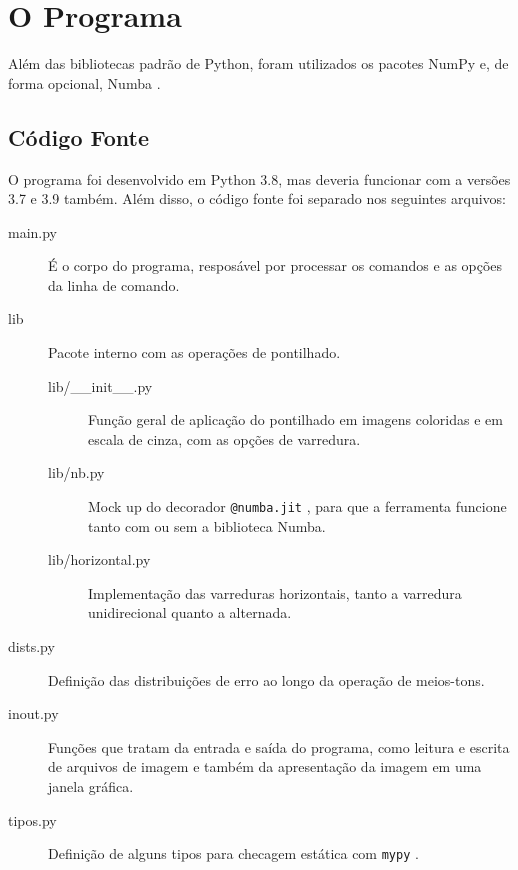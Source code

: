 \section{O Programa}

Além das bibliotecas padrão de Python, foram utilizados os pacotes NumPy \autocite{ref:numpy} e, de forma opcional, Numba \autocite{ref:numba}.

\subsection{Código Fonte}

    O programa foi desenvolvido em Python 3.8, mas deveria funcionar com a versões 3.7 e 3.9 também. Além disso, o código fonte foi separado nos seguintes arquivos:

    \begin{description}
        \item[main.py] É o corpo do programa, resposável por processar os comandos e as opções da linha de comando.

        \item[lib] Pacote interno com as operações de pontilhado.

        \begin{description}
            \item[lib/\_\_init\_\_.py] Função geral de aplicação do pontilhado em imagens coloridas e em escala de cinza, com as opções de varredura.

            \item[lib/nb.py] Mock up do decorador \texttt{@numba.jit} \autocite{ref:numbajit}, para que a ferramenta funcione tanto com ou sem a biblioteca Numba.

            \item[lib/horizontal.py] Implementação das varreduras horizontais, tanto a varredura unidirecional quanto a alternada.
        \end{description}

        \item[dists.py] Definição das distribuições de erro ao longo da operação de meios-tons.

        \item[inout.py] Funções que tratam da entrada e saída do programa, como leitura e escrita de arquivos de imagem e também da apresentação da imagem em uma janela gráfica.

        \item[tipos.py] Definição de alguns tipos para checagem estática com \texttt{mypy} \autocite{ref:mypy}.
    \end{description}

